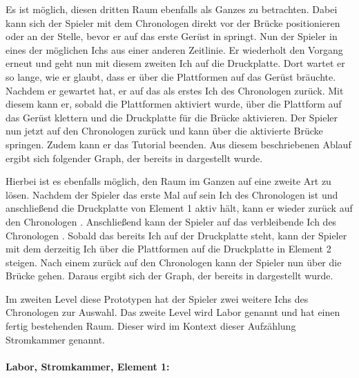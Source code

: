 Es ist möglich, diesen dritten Raum ebenfalls als Ganzes zu betrachten. Dabei kann sich der Spieler mit dem Chronologen direkt vor der Brücke positionieren oder an der Stelle, bevor er auf das erste Gerüst in  springt. Nun  der Spieler in eines der möglichen Ichs aus einer anderen Zeitlinie. Er wiederholt den Vorgang erneut und geht nun mit diesem zweiten Ich auf die Druckplatte. Dort wartet er so lange, wie er glaubt, dass er über die Plattformen auf das Gerüst bräuchte. Nachdem er gewartet hat,  er auf das als erstes  Ich des Chronologen zurück. Mit diesem kann er, sobald die Plattformen aktiviert wurde, über die Plattform auf das Gerüst klettern und die Druckplatte für die Brücke aktivieren. Der Spieler  nun jetzt auf den Chronologen zurück und kann über die aktivierte Brücke springen. Zudem kann er das Tutorial beenden.
Aus diesem beschriebenen Ablauf ergibt sich folgender Graph, der bereits in  dargestellt wurde.

Hierbei ist es ebenfalls möglich, den Raum im Ganzen auf eine zweite Art zu lösen. Nachdem der Spieler das erste Mal auf sein Ich des Chronologen  ist und anschließend die Druckplatte von Element 1 aktiv hält, kann er wieder zurück auf den Chronologen . Anschließend kann der Spieler auf das verbleibende Ich des Chronologen . Sobald das bereits  Ich auf der Druckplatte steht, kann der Spieler mit dem derzeitig  Ich über die Plattformen auf die Druckplatte in Element 2 steigen. Nach einem  zurück auf den Chronologen kann der Spieler nun über die Brücke gehen. Daraus ergibt sich der Graph, der bereits in  dargestellt wurde.

Im zweiten Level diese Prototypen hat der Spieler zwei weitere Ichs des Chronologen zur Auswahl. Das zweite Level wird Labor genannt und hat einen fertig bestehenden Raum. Dieser wird im Kontext dieser Aufzählung Stromkammer genannt.

\paragraph{Labor, Stromkammer, Element 1:}\label{p:lse1}


